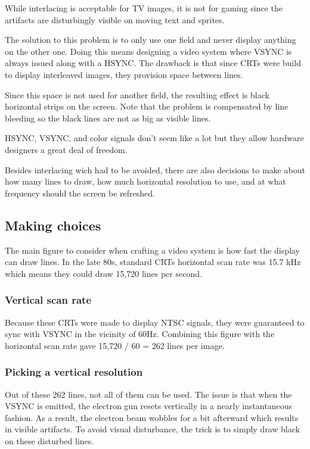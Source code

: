 While interlacing is acceptable for TV images, it is not for gaming since the artifacts are disturbingly visible on moving text and sprites. 

The solution to this problem is to only use one field and never display anything on the other one. Doing this means designing a video system where VSYNC is always issued along with a HSYNC. The drawback is that since CRTs were build to display interleaved images, they provision space between lines. 

Since this space is not used for another field, the resulting effect is black horizontal strips on the screen. Note that the problem is compensated by line bleeding so the black lines are not as big as visible lines.


HSYNC, VSYNC, and color signals don't seem like a lot but they allow hardware designers a great deal of freedom. 

Besides interlacing wich had to be avoided, there are also decisions to make about how many lines to draw, how much horizontal resolution to use, and at what frequency should the screen be refreshed.





\subsection{Making choices}
 The main figure to consider when crafting a video system is how fast the display can draw lines. In the late 80s, standard CRTs horizontal scan rate was 15.7 kHz which means they could draw 15,720 lines per second.





\subsubsection{Vertical scan rate}
Because these CRTs were made to display NTSC signals, they were guaranteed to sync with VSYNC in the vicinity of 60Hz. Combining this figure with the horizontal scan rate gave 15,720 / 60 = 262 lines per image.


\subsubsection{Picking a vertical resolution}
Out of these 262 lines, not all of them can be used. The issue is that when the VSYNC is emitted, the electron gun resets vertically in a nearly instantaneous fashion. As a result, the electron beam wobbles for a bit afterward which results in visible artifacts. To avoid visual disturbance, the trick is to simply draw black on these disturbed lines. 

